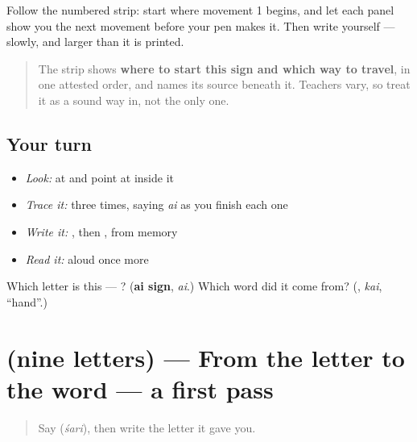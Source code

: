 Follow the numbered strip: start where movement 1 begins, and let each panel show you the next movement before your pen makes it. Then write  yourself — slowly, and larger than it is printed.

\begin{quote}
The strip shows \textbf{where to start this sign and which way to travel}, in one attested order, and names its source beneath it. Teachers vary, so treat it as a sound way in, not the only one.
\end{quote}

\subsection*{Your turn}
\begin{itemize}
\raggedright
  \item \emph{Look:} at \textbf{} and point at  inside it
  \item \emph{Trace it:}  three times, saying \emph{ai} as you finish each one
  \item \emph{Write it:} , then , from memory
  \item \emph{Read it:} \textbf{} aloud once more
\end{itemize}

\begin{tcolorbox}[breakable,colback=teal!4,colframe=teal!35!black,title={Before you move on}]
Which letter is this — ? (\textbf{ai sign}, \emph{ai}.) Which word did it come from? (\textbf{}, \emph{kai}, \textquotedblleft{}hand\textquotedblright{}.)
\end{tcolorbox}
\section[(nine letters)]{(nine letters) — From the letter to the word — a first pass}

\label{lesson:ML-R114-letters-first-pass}



\begin{quote}
Say \textbf{} (\emph{śari}), then write the letter it gave you.
\end{quote}

